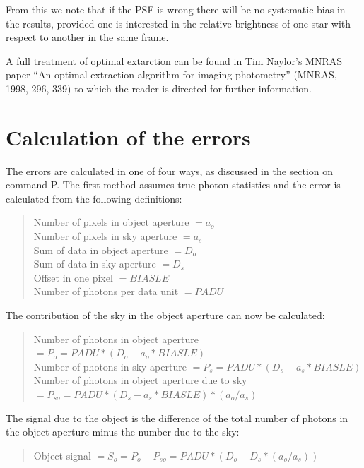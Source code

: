 \documentclass[twoside,11pt]{article}
\newcommand{\htmladdnormallink}[2]{#1}
\newcommand{\xlabel}[1]{}
\renewcommand{\_}{\texttt{\symbol{95}}}
\begin{document}
From this we note that if the PSF is wrong there will be no systematic bias in the results, provided one is interested in the relative brightness of one star with respect to another in the same frame.

A full treatment of optimal extarction can be found in Tim Naylor's MNRAS paper
``An optimal extraction algorithm for imaging photometry'' (\htmladdnormallink{MNRAS, 1998, 296, 339}{http://cdsads.u-strasbg.fr/cgi-bin/nph-bib_query?bibcode=1998MNRAS.296..339N&db_key=AST\&{}high=365efe227210385}) to which the reader is directed for further information.

\section{\xlabel{calculation_of_the_errors}Calculation \xlabel{errors}of \label{errors}the errors}

The errors are calculated in one of four ways, as discussed in the section
on command P. The first method assumes true photon statistics and the
error is calculated from the following definitions:

\begin{quote}
Number of pixels in object aperture  $= a_o$\\
Number of pixels in sky aperture     $= a_s$\\
Sum of data in object aperture       $= D_o$\\
Sum of data in sky aperture          $= D_s$\\
Offset in one pixel                  $= BIASLE$\\
Number of photons per data unit      $= PADU$
\end{quote}

The contribution of the sky in the object aperture can now be calculated:

\begin{quote}
Number of photons in object aperture $= P_o = PADU * ( D_o - a_o * BIASLE )$\\
Number of photons in sky aperture    $= P_s = PADU * ( D_s - a_s * BIASLE )$\\
Number of photons in object aperture due to sky
$= P_{so} = PADU * ( D_s - a_s * BIASLE ) * ( a_o / a_s )$
\end{quote}

The signal due to the object is the difference of the total number of
photons in the object aperture minus the number due to the sky:

\begin{quote}
Object signal $= S_o = P_o - P_{so} = PADU * ( D_o - D_s * ( a_o / a_s ) )$
\end{quote}
\end{document}
